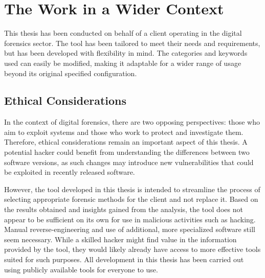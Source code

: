 \section{The Work in a Wider Context}
\label{sec:work-wider-context}
This thesis has been conducted on behalf of a client operating in the digital forensics sector. The tool
has been tailored to meet their needs and requirements, but has been developed with flexibility in mind. The categories and keywords used can easily be modified, making it adaptable for a wider range of usage beyond its original specified configuration. 

\subsection{Ethical Considerations}
In the context of digital forensics, there are two opposing perspectives: those who aim to exploit systems and those who work to protect and investigate them. Therefore, ethical considerations remain an important aspect of this thesis. A potential hacker could benefit from understanding the differences between two software versions, as such changes may introduce new vulnerabilities that could be exploited in recently released software.

However, the tool developed in this thesis is intended to streamline the process of selecting appropriate forensic methods for the client and not replace it. Based on the results obtained and insights gained from the analysis, the tool does not appear to be sufficient on its own for use in malicious activities such as hacking. Manual reverse-engineering and use of additional, more specialized software still seem necessary. While a skilled hacker might find value in the information provided by the tool, they would likely already have access to more effective tools suited for such purposes. All development in this thesis has been carried out using publicly available tools for everyone to use. 
